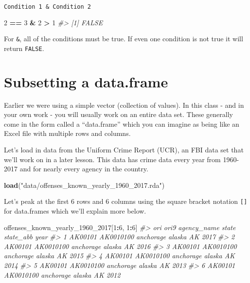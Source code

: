 \documentclass[
  12pt,
]{book}
\newenvironment{Shaded}{\begin{snugshade}}{\end{snugshade}}
\newcommand{\CommentTok}[1]{\textcolor[rgb]{0.56,0.35,0.01}{\textit{#1}}}
\newcommand{\DecValTok}[1]{\textcolor[rgb]{0.00,0.00,0.81}{#1}}
\newcommand{\KeywordTok}[1]{\textcolor[rgb]{0.13,0.29,0.53}{\textbf{#1}}}
\newcommand{\NormalTok}[1]{#1}
\newcommand{\OperatorTok}[1]{\textcolor[rgb]{0.81,0.36,0.00}{\textbf{#1}}}
\newcommand{\StringTok}[1]{\textcolor[rgb]{0.31,0.60,0.02}{#1}}
\begin{document}
\texttt{Condition\ 1\ \&\ Condition\ 2}

\begin{Shaded}
\begin{Highlighting}[]
\DecValTok{2} \OperatorTok{==}\StringTok{ }\DecValTok{3} \OperatorTok{\&}\StringTok{ }\DecValTok{2} \OperatorTok{>}\StringTok{ }\DecValTok{1}
\CommentTok{\#> [1] FALSE}
\end{Highlighting}
\end{Shaded}

For \texttt{\&}, all of the conditions must be true. If even one condition is not true it will return \texttt{FALSE}.

\hypertarget{subsetting-a-data.frame}{%
\section{Subsetting a data.frame}\label{subsetting-a-data.frame}}

Earlier we were using a simple vector (collection of values). In this class - and in your own work - you will usually work on an entire data set. These generally come in the form called a ``data.frame'' which you can imagine as being like an Excel file with multiple rows and columns.

Let's load in data from the Uniform Crime Report (UCR), an FBI data set that we'll work on in a later lesson. This data has crime data every year from 1960-2017 and for nearly every agency in the country.

\begin{Shaded}
\begin{Highlighting}[]
\KeywordTok{load}\NormalTok{(}\StringTok{"data/offenses\_known\_yearly\_1960\_2017.rda"}\NormalTok{)}
\end{Highlighting}
\end{Shaded}

Let's peak at the first 6 rows and 6 columns using the square bracket notation \texttt{{[}{]}} for data.frames which we'll explain more below.

\begin{Shaded}
\begin{Highlighting}[]
\NormalTok{offenses\_known\_yearly\_}\DecValTok{1960}\NormalTok{\_}\DecValTok{2017}\NormalTok{[}\DecValTok{1}\OperatorTok{:}\DecValTok{6}\NormalTok{, }\DecValTok{1}\OperatorTok{:}\DecValTok{6}\NormalTok{]}
\CommentTok{\#>       ori      ori9 agency\_name  state state\_abb year}
\CommentTok{\#> 1 AK00101 AK0010100   anchorage alaska        AK 2017}
\CommentTok{\#> 2 AK00101 AK0010100   anchorage alaska        AK 2016}
\CommentTok{\#> 3 AK00101 AK0010100   anchorage alaska        AK 2015}
\CommentTok{\#> 4 AK00101 AK0010100   anchorage alaska        AK 2014}
\CommentTok{\#> 5 AK00101 AK0010100   anchorage alaska        AK 2013}
\CommentTok{\#> 6 AK00101 AK0010100   anchorage alaska        AK 2012}
\end{Highlighting}
\end{Shaded}
\end{document}

